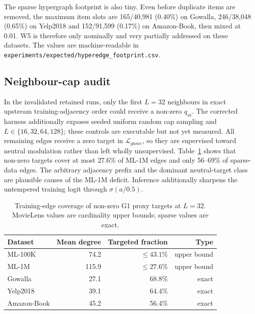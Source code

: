\documentclass[a4paper,fleqn,longmktitle]{cas-dc}
\begin{document}
The sparse hypergraph footprint is also tiny. Even before duplicate items are
removed, the maximum item slots are 165/40{,}981 (0.40\%) on Gowalla,
246/38{,}048 (0.65\%) on Yelp2018 and 152/91{,}599 (0.17\%) on Amazon-Book,
then mixed at 0.01. W5 is therefore only nominally and very partially addressed
on these datasets. The values are machine-readable in
\texttt{experiments/expected/hyperedge\_footprint.csv}.

\noindent{}

\subsection{Neighbour-cap audit}
\label{sec:cap-audit}

In the invalidated retained runs, only the first $L=32$ neighbours in exact
upstream training-adjacency order could receive a non-zero $q_{ui}$. The
corrected harness additionally exposes seeded uniform random cap sampling and
$L\in\{16,32,64,128\}$; these controls are executable but not yet measured.
All remaining edges receive a zero target in
$\mathcal L_{game}$, so they are supervised toward neutral modulation rather
than left wholly unsupervised. Table~\ref{tab:cap} shows that non-zero targets
cover at most 27.6\% of ML-1M edges and only 56--69\% of sparse-data edges.
The arbitrary adjacency prefix and the dominant neutral-target class are
plausible causes of the ML-1M deficit. Inference additionally sharpens the
untempered training logit through $\sigma(a/0.5)$.

\begin{table}[t]
\centering
\caption{Training-edge coverage of non-zero G1 proxy targets at $L=32$.
MovieLens values are cardinality upper bounds; sparse values are exact.}
\label{tab:cap}
\footnotesize
\begin{tabular}{lrrr}
\toprule
\textbf{Dataset} & \textbf{Mean degree} & \textbf{Targeted fraction} &
\textbf{Type}\\
\midrule
ML-100K & 74.2 & $\le43.1\%$ & upper bound\\
ML-1M & 115.9 & $\le27.6\%$ & upper bound\\
Gowalla & 27.1 & 68.8\% & exact\\
Yelp2018 & 39.1 & 64.4\% & exact\\
Amazon-Book & 45.2 & 56.4\% & exact\\
\bottomrule
\end{tabular}
\end{table}
\end{document}
